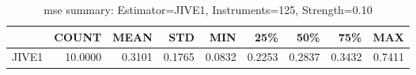 \begin{table}[ht]
\centering
\caption{mse summary: Estimator=JIVE1, Instruments=125, Strength=0.10}
\begin{tabular}{lrrrrrrrr}
\toprule
 & COUNT & MEAN & STD & MIN & 25\% & 50\% & 75\% & MAX \\
\midrule
JIVE1 & 10.0000 & 0.3101 & 0.1765 & 0.0832 & 0.2253 & 0.2837 & 0.3432 & 0.7411 \\
\bottomrule
\end{tabular}
\end{table}
